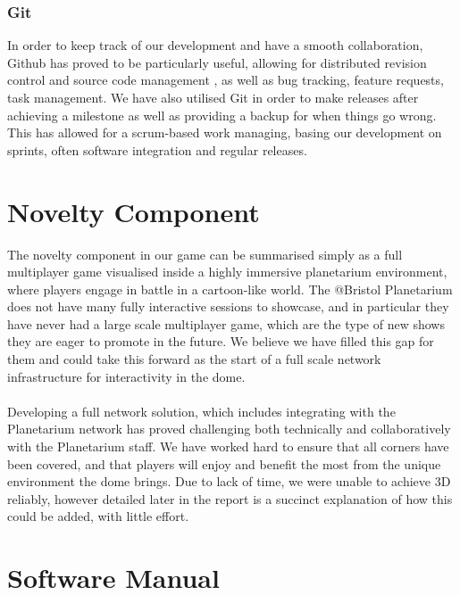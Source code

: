 \documentclass[11pt,a4paper]{article}
\begin{document}
 \subsubsection{Git}
 In order to keep track of our development and have a smooth collaboration, Github has proved to be particularly useful, allowing for distributed revision control and source code management , as well as bug tracking, feature requests, task management. We have also utilised Git in order to make releases after achieving a milestone as well as providing a backup for when things go wrong. This has allowed for a scrum-based work managing, basing our development on sprints, often software integration and regular releases.

\pagebreak

\section{Novelty Component}

 The novelty component in our game can be summarised simply as a full multiplayer game visualised inside a highly immersive planetarium environment, where players engage in battle in a cartoon-like world. The @Bristol Planetarium does not have many fully interactive sessions to showcase, and in particular they have never had a large scale multiplayer game, which are the type of new shows they are eager to promote in the future. We believe we have filled this gap for them and could take this forward as the start of a full scale network infrastructure for interactivity in the dome. \\ \\
 Developing a full network solution, which includes integrating with the Planetarium network has proved challenging both technically and collaboratively with the Planetarium staff. We have worked hard to ensure that all corners have been covered, and that players will enjoy and benefit the most from the unique environment the dome brings. Due to lack of time, we were unable to achieve 3D reliably, however detailed later in the report is a succinct explanation of how this could be added, with little effort.

 \section{Software Manual}
\end{document}
